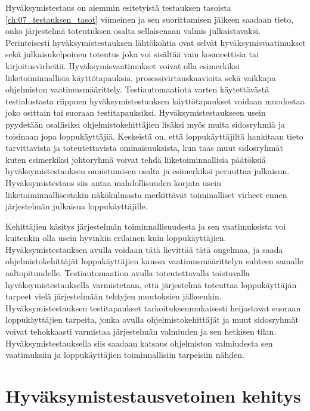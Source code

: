   Hyväksymistestaus on aiemmin esitetyistä testauksen tasoista \ref{ch:07_testauksen_tasot} viimeinen ja sen suorittamisen jälkeen saadaan tieto, onko järjestelmä toteutuksen osalta sellaisenaan valmis julkaistavaksi.
  Perinteisesti hyväksymistestauksen lähtökohtia ovat selvät hyväksymisvaatimukset sekä julkaisukelpoinen toteutus joka voi sisältää vain kosmeettisia tai kirjoitusvirheitä.
  Hyväksymisvaatimukset voivat olla esimerkiksi liiketoiminnallisia käyttötapauksia, prosessivirtauskaavioita sekä vaikkapa ohjelmiston vaatimusmäärittely.
  Testiautomaatiota varten käytettävästä testialustasta riippuen hyväksymistestauksen käyttötapaukset voidaan muodostaa joko osittain tai suoraan testitapauksiksi.
  Hyväksymistestaukseen usein pyydetään osallisiksi ohjelmistokehittäjien lisäksi myös muita sidosryhmiä ja toisinaan jopa loppukäyttäjiä.
  Keskeistä on, että loppukäyttäjiltä hankitaan tieto tarvittavista ja toteutettavista ominaisuuksista, kun taas muut sidosryhmät kuten esimerkiksi johtoryhmä voivat tehdä liiketoiminnallisia päätöksiä hyväksymistestauksen onnistumisen osalta ja esimerkiksi peruuttaa julkaisun.
  Hyväksymistestaus siis antaa mahdollisuuden korjata usein liiketoiminnallisestakin näkökulmasta merkittävät toiminalliset virheet ennen järjestelmän julkaisua loppukäyttäjille.

  Kehittäjien käsitys järjestelmän toiminnallisuudesta ja sen vaatimuksista voi kuitenkin olla usein hyvinkin erilainen kuin loppukäyttäjien.
  Hyväksymistestauksen avulla voidaan tätä lievittää tätä ongelmaa, ja saada ohjelmistokehittäjät loppukäyttäjien kanssa vaatimusmäärittelyn suhteen samalle aaltopituudelle.
  Testiautomaation avulla toteutettavalla toistuvalla hyväksymistestauksella varmistetaan, että järjestelmä toteuttaa loppukäyttäjän tarpeet vielä järjestelmään tehtyjen muutoksien jälkeenkin.
  Hyväksymistestauksen testitapaukset tarkoituksenmukaisesti heijastavat suoraan loppukäyttäjien tarpeita, jonka avulla ohjelmistokehittäjät ja muut sidosryhmät voivat tehokkaasti varmistaa järjestelmän valmiuden ja sen hetkisen tilan.
  Hyväksymistestauksella siis saadaan katsaus ohjelmiston valmiudesta sen vaatimuksiin ja loppukäyttäjien toiminnallisiin tarpeisiin nähden.

\section{Hyväksymistestausvetoinen kehitys} \label{ch:08_hyvaksymistestausvetoinen_kehitys}

